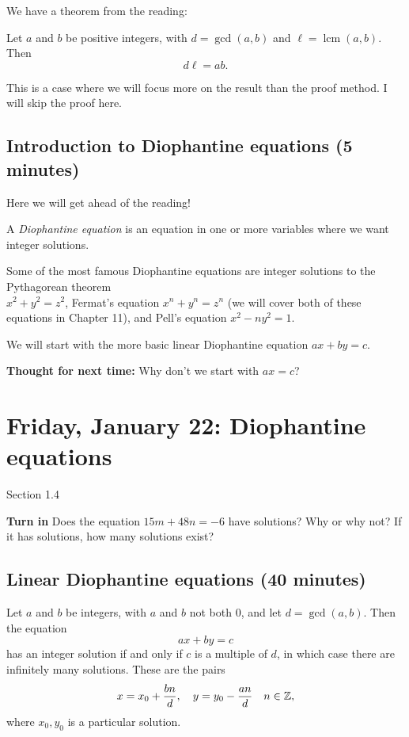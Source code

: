 \documentclass[letterpaper, 11 pt]{article}
\begin{document}
We have a theorem from the reading: 
\begin{thm}[Theorem 1.12]
 Let $a$ and $b$ be positive integers, with $d=\gcd(a,b)$ and $\ell=\operatorname{lcm}(a,b)$. Then \[d\ell=ab.\]
\end{thm}

This is a case where we will focus more on the result than the proof method. I will skip the proof here.

\subsection{Introduction to Diophantine equations (5 minutes)}

Here we will get ahead of the reading!

\begin{defn}
 A \emph{Diophantine equation} is an equation in one or more variables where we want integer solutions. 
 \end{defn}

 Some of the most famous Diophantine equations are integer solutions to the Pythagorean theorem \\$x^2+y^2=z^2$, Fermat's equation $x^n+y^n=z^n$ (we will cover both of these equations in Chapter 11), and Pell's equation $x^2-ny^2=1$.

We will start with the more basic linear Diophantine equation $ax+by=c$. 

{\bf Thought for next time:} Why don't we start with $ax=c$?



\section{Friday, January 22: Diophantine equations}
Section 1.4

{\bf Turn in} Does the equation $15m+48n=-6$ have solutions? Why or why not? If it has solutions, how many solutions exist?

\subsection{Linear Diophantine equations (40 minutes)}
\begin{thm}[Theorem 1.13]
 Let $a$ and $b$ be integers, with $a$ and $b$ not both $0$, and let $d=\gcd(a,b)$. Then the equation \[ax+by=c\] has an integer solution if and only if $c$ is a multiple of $d$, in which case there are infinitely many solutions. These are the pairs \[x=x_0+\frac{bn}{d},\quad y=y_0-\frac{an}{d}\quad n\in\mathbb Z,\] where $x_0,y_0$ is a particular solution.
\end{thm}
\end{document}
